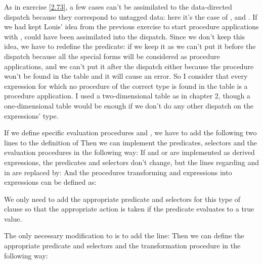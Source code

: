 \begin{exe}[4.3]
    As in exercise \ref{2.73}, a few cases can’t be assimilated to the 
    data-directed dispatch because they correspond to untagged data: here it’s 
    the case of ,  and 
    . If we had kept Louis’ idea from the previous exercise 
    to start procedure applications with ,  could 
    have been assimilated into the dispatch. Since we don’t keep this idea, we 
    have to redefine the  predicate: if we keep it as 
     we can’t put it before the dispatch because all the special 
    forms will be considered as procedure applications, and we can’t put it 
    after the dispatch either because the procedure won’t be found in the table 
    and it will cause an error. So I consider that every expression for which no 
    procedure of the correct type is found in the table is a procedure 
    application. I used a two-dimensional table as in chapter 2, though 
    a one-dimensional table would be enough if we don’t do any other dispatch on 
    the expressions’ type.
\end{exe}

\begin{exe}[4.4]
    If we define specific evaluation procedures  and 
    , we have to add the following two lines to the definition of 
    Then we can implement the predicates, selectors and the evaluation 
    procedures in the following way:
    If  and {or} are implemented as derived expressions, the 
    predicates and selectors don’t change, but the lines regarding  
    and  in  are replaced by:
    And the procedures transforming  and  expressions into 
     expressions can be defined as:
\end{exe}

\begin{exe}[4.5]
    We only need to add the appropriate predicate and selectors for this type of 
    clause so that the appropriate action is taken if the predicate evaluates to 
    a true value.
\end{exe}

\begin{exe}[4.6]
    The only necessary modification to  is to add the line:
    Then we can define the appropriate predicate and selectors and the 
    transformation procedure  in the following way:
\end{exe}

